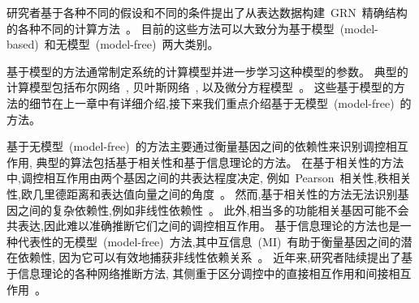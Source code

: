 
研究者基于各种不同的假设和不同的条件提出了从表达数据构建~GRN~精确结构的各种不同的计算方法~\cite{longabaugh2005computational,karlebach2008modelling}。
目前的这些方法可以大致分为基于模型~(model-based)~和无模型~(model-free)~两大类别。

基于模型的方法通常制定系统的计算模型并进一步学习这种模型的参数。
典型的计算模型包括布尔网络~\cite{shmulevich2002probabilistic,kim2007boolean,bornholdt2008boolean,zhou2016relative},
贝叶斯网络~\cite{kim2003inferring,zou2004new,chen2006effective,needham2007primer,lo2015high},
以及微分方程模型~\cite{gardner2003inferring,di2005chemogenomic,bansal2006inference, honkela2010model,lu2011high,li2011large}。
这些基于模型的方法的细节在上一章中有详细介绍,接下来我们重点介绍基于无模型~(model-free)~的方法。

基于无模型~(model-free)~的方法主要通过衡量基因之间的依赖性来识别调控相互作用,
典型的算法包括基于相关性和基于信息理论的方法。
在基于相关性的方法中,调控相互作用由两个基因之间的共表达程度决定,
例如~Pearson~相关性,秩相关性,欧几里德距离和表达值向量之间的角度~\cite{wang2014review}。
然而,基于相关性的方法无法识别基因之间的复杂依赖性,例如非线性依赖性~\cite{ruyssinck2014nimefi}。
此外,相当多的功能相关基因可能不会共表达,因此难以准确推断它们之间的调控相互作用。
基于信息理论的方法也是一种代表性的无模型~(model-free)~方法,其中互信息~(MI)~有助于衡量基因之间的潜在依赖性,
因为它可以有效地捕获非线性依赖关系~\cite{brunel2010miss,zhang2011inferring}。
近年来,研究者陆续提出了基于信息理论的各种网络推断方法,
其侧重于区分调控中的直接相互作用和间接相互作用~\cite{marbach2010revealing}。

